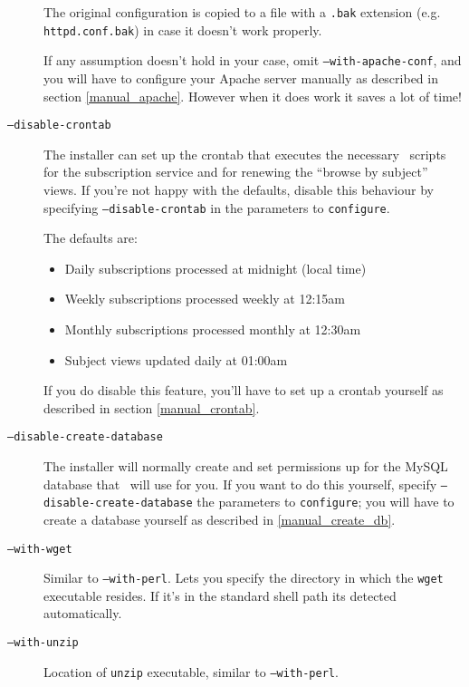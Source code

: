 \begin{description}
The original configuration is copied to a file with a {\tt .bak} extension (e.g. {\tt httpd.conf.bak}) in case it doesn't work properly.

If any assumption doesn't hold in your case, omit {\tt --with-apache-conf}, and you will have to configure your Apache server manually as described in section \ref{manual_apache}. However when it does work it saves a lot of time!

\item[{\tt --disable-crontab}]

The installer can set up the crontab that executes the necessary \eprints\ scripts for the subscription service and for renewing the ``browse by subject'' views. If you're not happy with the defaults, disable this behaviour by specifying {\tt --disable-crontab} in the parameters to {\tt configure}.

The defaults are:

\begin{itemize}
\item Daily subscriptions processed at midnight (local time)
\item Weekly subscriptions processed weekly at 12:15am
\item Monthly subscriptions processed monthly at 12:30am
\item Subject views updated daily at 01:00am
\end{itemize}

If you do disable this feature, you'll have to set up a crontab yourself as described in section \ref{manual_crontab}.

\item[{\tt --disable-create-database}]

The installer will normally create and set permissions up for the MySQL database that \eprints\ will use for you. If you want to do this yourself, specify {\tt --disable-create-database} the parameters to {\tt configure}; you will have to create a database yourself as described in \ref{manual_create_db}.

\item[{\tt --with-wget}]

Similar to {\tt --with-perl}. Lets you specify the directory in which the {\tt wget} executable resides. If it's in the standard shell path its detected automatically.

\item[{\tt --with-unzip}]

Location of {\tt unzip} executable, similar to {\tt --with-perl}.


\end{description}
